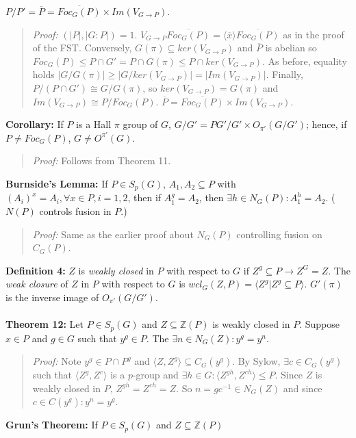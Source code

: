 $P/P' = {\overline P} = {\overline {Foc_G(P)}} \times Im(V_{G \rightarrow P})$.
\begin{quote}
\emph{Proof:}  $(|P|,|G:P|) = 1$.  $V_{G \rightarrow P} {\overline {Foc_G(P)}} = \langle {\overline x} \rangle {\overline {Foc_G(P)}}$ as in the
proof of the FST.  Conversely, $G(\pi) \subseteq ker(V_{G \rightarrow P})$ and ${\overline P}$ is abelian so
$Foc_G(P) \leq P \cap G' = P \cap G(\pi) \leq P \cap ker(V_{G \rightarrow P})$.  As before, equality holds 
$|G/G(\pi)| \geq |G/ker(V_{G \rightarrow P})| = |Im(V_{G\rightarrow P})|$.
Finally, $P/(P \cap G') \cong G/G(\pi)$,
so $ker(V_{G \rightarrow P}) = G(\pi)$ and $Im(V_{G \rightarrow P}) \cong P/Foc_G(P)$.
${\overline P} = {\overline {Foc_G(P)}} \times Im(V_{G \rightarrow P})$.
\end{quote}
{\bf Corollary:} If $P$ is a Hall $\pi$
group of $G$, $G/G'= PG'/G' \times O_{\pi'}(G/G')$; hence, if $P \ne Foc_G(P)$,
$G \ne O^{\pi'}(G)$.
\begin{quote}
\emph{Proof:}  
Follows from Theorem 11.
\end{quote}
{\bf Burnside's Lemma:}  If $P \in S_p(G)$, $A_1, A_2 \subseteq P$ with 
$(A_i)^x = A_i, \forall x \in P, i= 1, 2$, then
if $A_1^g=A_2$, then $\exists h \in N_G(P): A_1^h=A_2$. ($N(P)$ controls fusion in $P$.)
\begin{quote}
\emph{Proof:}  
Same as the earlier proof about $N_G(P)$ controlling fusion on $C_G(P)$.
\end{quote}
{\bf Definition 4:}
$Z$ is \emph {weakly closed} in $P$ with respect to $G$ if $Z^g \subseteq P \rightarrow Z^G=Z$.
The \emph {weak closure} of $Z$ in $P$ with respect to $G$ is 
$wcl_G(Z, P)= \langle Z^g| Z^g \subseteq P \rangle$.  $G'(\pi)$ is the inverse image of
$O_{\pi'}(G/G')$.
\\
\\
{\bf Theorem 12:}
Let $P \in S_p(G)$ and $Z \subseteq {\mathbb Z}(P)$ 
is weakly closed in $P$.  Suppose $x \in P$ and $g \in G$ such that
$y^g \in P$.  The $\exists n \in N_G(Z): y^g=y^n$.
\begin{quote}
\emph{Proof:}  
Note $y^g \in P \cap P^g$ and $ \langle Z, Z^g \rangle \subseteq C_G(y^g )$.  By Sylow,
$\exists c \in C_G(y^g )$ such that 
$ \langle Z^g, Z^c \rangle $ is a $p$-group and $\exists h \in G:
\langle Z^{gh}, Z^{ch} \rangle \le P$.  Since $Z$ is weakly closed in $P$, 
$Z^{gh}= Z^{ch}= Z$. So
$n= g c^{-1} \in N_G(Z)$ and since $c \in C(y^g): y^n= y^g$.
\end{quote}
{\bf Grun's Theorem:} If $P \in S_p(G)$ and $Z \subseteq {\mathbb Z}(P)$ 
